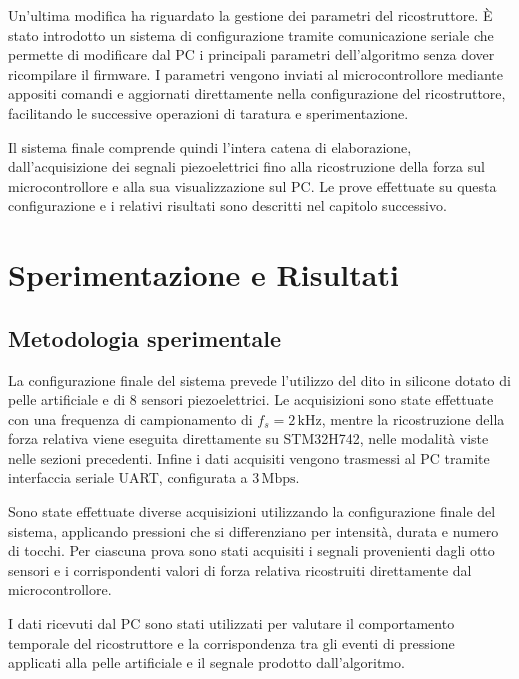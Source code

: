\documentclass[10pt, a4paper]{article}
\begin{document}
                Un'ultima modifica ha riguardato la gestione dei parametri del ricostruttore. È stato introdotto un sistema di configurazione tramite 
                comunicazione seriale che permette di modificare dal PC i principali parametri dell'algoritmo senza dover ricompilare il firmware. I parametri 
                vengono inviati al microcontrollore mediante appositi comandi e aggiornati direttamente nella configurazione del ricostruttore, facilitando 
                le successive operazioni di taratura e sperimentazione.

                Il sistema finale comprende quindi l'intera catena di elaborazione, dall'acquisizione dei segnali piezoelettrici fino alla ricostruzione della 
                forza sul microcontrollore e alla sua visualizzazione sul PC. Le prove effettuate su questa configurazione e i relativi risultati sono descritti 
                nel capitolo successivo.

    \section{Sperimentazione e Risultati}
        \subsection{Metodologia sperimentale}
            La configurazione finale del sistema prevede l'utilizzo del dito in silicone dotato di pelle artificiale e di 8 sensori piezoelettrici.
            Le acquisizioni sono state effettuate con una frequenza di campionamento di $f_s = 2\,\mathrm{kHz}$, mentre la ricostruzione della forza relativa viene 
            eseguita direttamente su STM32H742, nelle modalità viste nelle sezioni precedenti. Infine i dati acquisiti vengono trasmessi al PC tramite
            interfaccia seriale UART, configurata a $3\,\mathrm{Mbps}$.

            Sono state effettuate diverse acquisizioni utilizzando la configurazione finale del sistema, applicando pressioni che si differenziano
            per intensità, durata e numero di tocchi.
            Per ciascuna prova sono stati acquisiti i segnali provenienti dagli otto sensori e i corrispondenti valori di forza relativa ricostruiti
            direttamente dal microcontrollore.
            
            I dati ricevuti dal PC sono stati utilizzati per valutare il comportamento temporale del ricostruttore e la corrispondenza tra gli eventi
            di pressione applicati alla pelle artificiale e il segnale prodotto dall'algoritmo.
\end{document}
